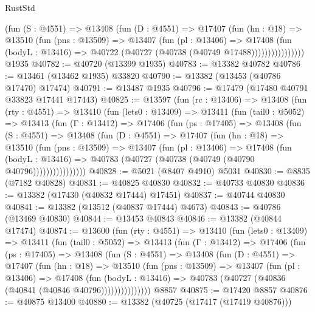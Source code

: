 \begin{lexlean}{RustStd}
\begin{coremodule}
                  (fun (S : @4551) =>
                  @13408
                    (fun (D : @4551) =>
                    @17407
                      (fun (hn : @18) =>
                      @13510
                        (fun (pns : @13509) =>
                        @13407
                          (fun (pl : @13406) =>
                          @17408
                            (fun (bodyL : @13416) =>
                            @40722 (@40727 (@40738 (@40749 @17488))))))))))))))))
    @1935
@40782 := @40720 (@13399 @1935)
@40783 := @13382 @40782
@40786 := @13461 (@13462 @1935) @33820
@40790 := @13382 (@13453 (@40786 @17470) @17474)
@40791 := @13487 @1935
@40796 := @17479 (@17480 @40791 @33823 @17441 @17443)
@40825 := @13597
    (fun (rc : @13406) =>
    @13408
      (fun (rty : @4551) =>
      @13410
        (fun (lets0 : @13409) =>
        @13411
          (fun (tail0 : @5052) =>
          @13413
            (fun (Γ : @13412) =>
            @17406
              (fun (ps : @17405) =>
              @13408
                (fun (S : @4551) =>
                @13408
                  (fun (D : @4551) =>
                  @17407
                    (fun (hn : @18) =>
                    @13510
                      (fun (pns : @13509) =>
                      @13407
                        (fun (pl : @13406) =>
                        @17408
                          (fun (bodyL : @13416) =>
                          @40783 (@40727 (@40738 (@40749 (@40790 @40796))))))))))))))))
@40828 := @5021 (@8407 @4910) @5031
@40830 := @8835 (@7182 @40828)
@40831 := @40825 @40830
@40832 := @40733 @40830
@40836 := @13382 (@17430 (@40832 @17444) @17451)
@40837 := @40744 @40830
@40841 := @13382 (@13512 (@40837 @17444) @4673)
@40843 := @40786 (@13469 @40830)
@40844 := @13453 @40843
@40846 := @13382 (@40844 @17474)
@40874 := @13600
    (fun (rty : @4551) =>
    @13410
      (fun (lets0 : @13409) =>
      @13411
        (fun (tail0 : @5052) =>
        @13413
          (fun (Γ : @13412) =>
          @17406
            (fun (ps : @17405) =>
            @13408
              (fun (S : @4551) =>
              @13408
                (fun (D : @4551) =>
                @17407
                  (fun (hn : @18) =>
                  @13510
                    (fun (pns : @13509) =>
                    @13407
                      (fun (pl : @13406) =>
                      @17408
                        (fun (bodyL : @13416) =>
                        @40783 (@40727 (@40836 (@40841 (@40846 @40796)))))))))))))))
    @8857
@40875 := @17420 @8857
@40876 := @40875 @13400
@40880 := @13382 (@40725 (@17417 (@17419 @40876)))

\end{coremodule}
\end{lexlean}
